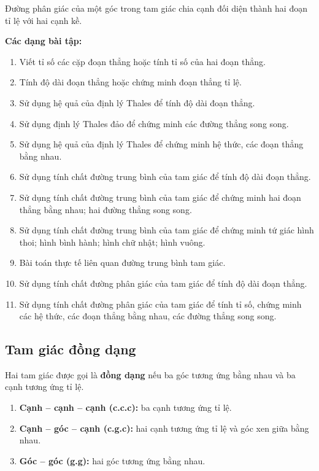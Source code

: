 \documentclass[12pt,a4paper]{article}
\begin{document}
\begin{tinhchat}[title={Tính chất đường phân giác}]
  Đường phân giác của một góc trong tam giác chia cạnh đối diện thành hai đoạn tỉ lệ với hai cạnh kề.
\end{tinhchat}

\medskip\noindent\textbf{Các dạng bài tập:}
\begin{enumerate}[label=\textbf{Dạng \arabic*:}, leftmargin=*, align=left]
  \item Viết tỉ số các cặp đoạn thẳng hoặc tính tỉ số của hai đoạn thẳng.
  \item Tính độ dài đoạn thẳng hoặc chứng minh đoạn thẳng tỉ lệ.
  \item Sử dụng hệ quả của định lý Thales để tính độ dài đoạn thẳng.
  \item Sử dụng định lý Thales đảo để chứng minh các đường thẳng song song.
  \item Sử dụng hệ quả của định lý Thales để chứng minh hệ thức, các đoạn thẳng bằng nhau.
  \item Sử dụng tính chất đường trung bình của tam giác để tính độ dài đoạn thẳng.
  \item Sử dụng tính chất đường trung bình của tam giác để chứng minh hai đoạn thẳng bằng nhau; hai đường thẳng song song.
  \item Sử dụng tính chất đường trung bình của tam giác để chứng minh tứ giác hình thoi; hình bình hành; hình chữ nhật; hình vuông.
  \item Bài toán thực tế liên quan đường trung bình tam giác.
  \item Sử dụng tính chất đường phân giác của tam giác để tính độ dài đoạn thẳng.
  \item Sử dụng tính chất đường phân giác của tam giác để tính tỉ số, chứng minh các hệ thức, các đoạn thẳng bằng nhau, các đường thẳng song song.
\end{enumerate}

\subsection{Tam giác đồng dạng}

\begin{dinhnghia}
  Hai tam giác được gọi là \textbf{đồng dạng} nếu ba góc tương ứng bằng nhau và ba cạnh tương ứng tỉ lệ.
\end{dinhnghia}

\begin{dinhly}[title={Ba trường hợp đồng dạng của tam giác}]
  \begin{enumerate}
    \item \textbf{Cạnh -- cạnh -- cạnh (c.c.c):} ba cạnh tương ứng tỉ lệ.
    \item \textbf{Cạnh -- góc -- cạnh (c.g.c):} hai cạnh tương ứng tỉ lệ và góc xen giữa bằng nhau.
    \item \textbf{Góc -- góc (g.g):} hai góc tương ứng bằng nhau.
  \end{enumerate}
\end{dinhly}
\end{document}
